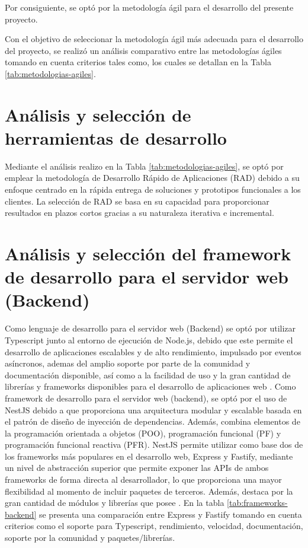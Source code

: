 \bigbreak
Por consiguiente, se optó por la metodología ágil para el desarrollo del presente proyecto.



Con el objetivo de seleccionar la metodología ágil más adecuada para el desarrollo del proyecto, se realizó un
análisis comparativo entre las metodologías ágiles tomando en cuenta criterios tales como, los cuales se detallan en
la Tabla \ref{tab:metodologias-agiles}.




\section{Análisis y selección de herramientas de desarrollo}

Mediante el análisis realizo en la Tabla \ref{tab:metodologias-agiles}, se optó por emplear la metodología de
Desarrollo Rápido de Aplicaciones (RAD) debido a su enfoque centrado en la rápida entrega de soluciones y
prototipos funcionales a los clientes. La selección de RAD se basa en su capacidad para proporcionar resultados
en plazos cortos gracias a su naturaleza iterativa e incremental.

\section{Análisis y selección del framework de desarrollo para el servidor web (Backend)}

Como lenguaje de desarrollo para el servidor web (Backend) se optó por utilizar Typescript junto al entorno de
ejecución de Node.js, debido que este permite el desarrollo de aplicaciones escalables y de alto rendimiento,
impulsado por eventos asíncronos, ademas del amplio soporte por parte de la comunidad y documentación disponible,
así como a la facilidad de uso y la gran cantidad de librerías y frameworks disponibles para el desarrollo de aplicaciones
web \cite{haroDesarrolloBackendPara}.
\bigbreak
Como framework de desarrollo para el servidor web (backend), se optó por el uso de NestJS debido a que proporciona
una arquitectura modular y escalable basada en el patrón de diseño de inyección de dependencias. Además, combina
elementos de la programación orientada a objetos (POO), programación funcional (PF) y programación funcional
reactiva (PFR). NestJS permite utilizar como base dos de los frameworks más populares en el desarrollo web, Express y
Fastify, mediante un nivel de abstracción superior que permite exponer las APIs de ambos frameworks de forma
directa al desarrollador, lo que proporciona una mayor flexibilidad al momento de incluir paquetes de terceros.
Además, destaca por la gran cantidad de módulos y librerías que posee \cite{phamDEVELOPINGBACKENDWEB2020}.
\bigbreak
En la tabla \ref{tab:frameworks-backend} se presenta una comparación entre Express y Fastify tomando en cuenta
criterios como el soporte para Typescript, rendimiento, velocidad, documentación, soporte por la comunidad y
paquetes/librerías.

